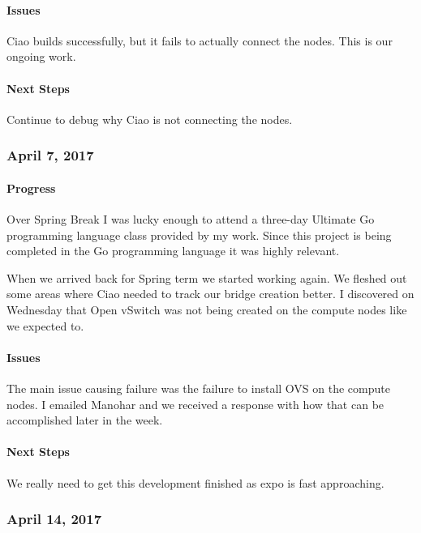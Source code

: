\documentclass[10pt,onecolumn,journal,draftclsnofoot]{IEEEtran}
\begin{document}
\paragraph{Issues} 

Ciao builds successfully, but it fails to actually connect the nodes.
This is our ongoing work.

\paragraph{Next Steps} 

Continue to debug why Ciao is not connecting the nodes.

\subsubsection{April 7, 2017} 

\paragraph{Progress} 

Over Spring Break I was lucky enough to attend a three-day Ultimate Go
programming language class provided by my work. Since this project is
being completed in the Go programming language it was highly relevant.

When we arrived back for Spring term we started working again. We
fleshed out some areas where Ciao needed to track our bridge creation
better. I discovered on Wednesday that Open vSwitch was not being
created on the compute nodes like we expected to.

\paragraph{Issues} 

The main issue causing failure was the failure to install OVS on the
compute nodes. I emailed Manohar and we received a response with how
that can be accomplished later in the week.

\paragraph{Next Steps} 

We really need to get this development finished as expo is fast
approaching.

\subsubsection{April 14, 2017} 
\end{document}
